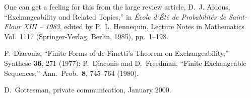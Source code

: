 \documentclass[12pt,aps,eqsecnum]{revtex4-1}
\begin{document}
\begin{thebibliography}{10}
One can get a feeling for this from the large review article, D.~J.
Aldous, ``Exchangeability and Related Topics,'' in {\sl \'Ecole
d'\'Et\'e de Probabilit\'es de Saint-Flour XIII -- 1983}, edited by
P.~L. Hennequin, Lecture Notes in Mathematics Vol.\ 1117
(Springer-Verlag, Berlin, 1985), pp.~1--198.

P.~Diaconis, ``Finite Forms of de Finetti's Theorem on
Exchangeability,'' Synthese {\bf 36}, 271 (1977); P.~Diaconis and
D.~Freedman, ``Finite Exchangeable Sequences,'' Ann.\ Prob.\ {\bf 8},
745--764 (1980).

D.~Gottesman, private communication, January 2000.

\end{thebibliography}
\end{document}
